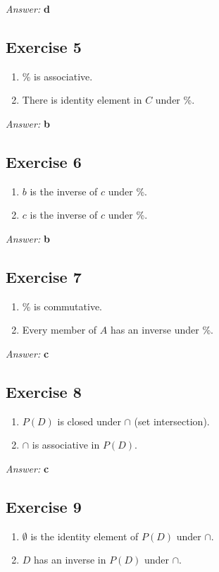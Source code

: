 \documentclass[11pt]{article}
\begin{document}
\emph{Answer:} \textbf{d}
\subsection{Exercise 5}
\label{sec-2-5}
\begin{enumerate}
\item \% is associative.
\item There is identity element in $C$ under \%.
\end{enumerate}

\emph{Answer:} \textbf{b}
\subsection{Exercise 6}
\label{sec-2-6}
\begin{enumerate}
\item $b$ is the inverse of $c$ under \%.
\item $c$ is the inverse of $c$ under \%.
\end{enumerate}

\emph{Answer:} \textbf{b}
\subsection{Exercise 7}
\label{sec-2-7}
\begin{enumerate}
\item \% is commutative.
\item Every member of $A$ has an inverse under \%.
\end{enumerate}

\emph{Answer:} \textbf{c}
\subsection{Exercise 8}
\label{sec-2-8}
\begin{enumerate}
\item $P(D)$ is closed under $\cap$ (set intersection).
\item $\cap$ is associative in $P(D)$.
\end{enumerate}

\emph{Answer:} \textbf{c}
\subsection{Exercise 9}
\label{sec-2-9}
\begin{enumerate}
\item $\emptyset$ is the identity element of $P(D)$ under $\cap$.
\item $D$ has an inverse in $P(D)$ under $\cap$.
\end{enumerate}
\end{document}
